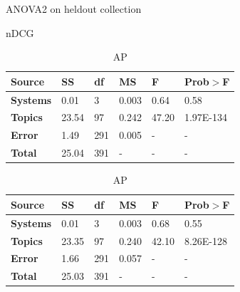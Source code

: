 \begin{table}[tbp]
     \caption{ANOVA2 on heldout collection}
    \begin{subtable}[t]{1\textwidth}
        \centering
	\caption{\ac{nDCG}}
	\begin{tabular}{|l|l|l|l|l|l|}
	\toprule
        \textbf{Source} & \textbf{SS} & \textbf{df} & \textbf{MS} & \textbf{F} & \textbf{Prob$>$F} \\
        \midrule
	\textbf{Systems} & 0.01 & 3   & 0.003  & 0.64  & 0.58 \\
	\textbf{Topics}    & 23.54  & 97  & 0.242 & 47.20 & 1.97E-134 \\
	\textbf{Error}   & 1.49  & 291 & 0.005 & - & - \\
	\textbf{Total}   & 25.04  & 391 & - & - & - \\
	\bottomrule
       \end{tabular}
    \end{subtable}
        \begin{subtable}[t]{1\textwidth}
        \centering
	\caption{\ac{AP}}
        \begin{tabular}{|l|l|l|l|l|l|}
	\toprule
        \textbf{Source} & \textbf{SS} & \textbf{df} & \textbf{MS} & \textbf{F} & \textbf{Prob$>$F} \\
        \midrule
	\textbf{Systems} & 0.01 & 3  & 0.003  & 0.68  & 0.55 \\
	\textbf{Topics}    & 23.35  & 97  & 0.240 & 42.10 & 8.26E-128 \\
	\textbf{Error}   & 1.66  & 291 & 0.057 & - & - \\
	\textbf{Total}   & 25.03  & 391 & - & - & - \\
	\bottomrule
       \end{tabular}
    \end{subtable}
     \label{tab:heldout-anova2}
\end{table}

